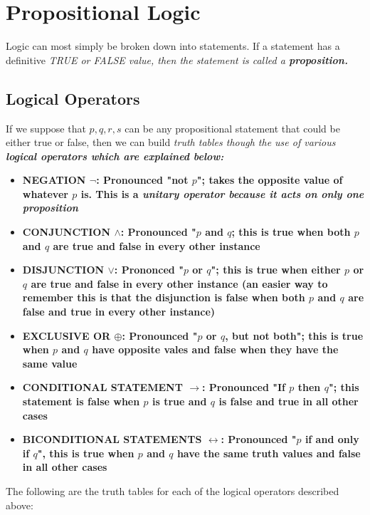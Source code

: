 \section{Propositional Logic}

Logic can most simply be broken down into statements. If a statement has a definitive \it{TRUE} or \it{FALSE} value, then the statement is called a \bf{proposition}. \\


\subsection{Logical Operators}

If we suppose that $p,q,r,s$ can be any propositional statement that could be either true or false, then we can build \it{truth tables} though the use of various \bf{logical operators} which are explained below:

\begin{itemize}
    \item \bf{NEGATION $\neg$:} Pronounced "not $p$"; takes the opposite value of whatever $p$ is. This is a \it{unitary operator} because it acts on only one proposition
    \item \bf{CONJUNCTION $\wedge$:} Pronounced "$p$ and $q$; this is true when both $p$ and $q$ are true and false in every other instance
    \item \bf{DISJUNCTION $\vee$:} Prononced "$p$ or $q$"; this is true when either $p$ or $q$ are true and false in every other instance (an easier way to remember this is that the disjunction is false when both $p$ and $q$ are false and true in every other instance)
    \item \bf{EXCLUSIVE OR $\oplus$:} Pronounced "$p$ or $q$, but not both"; this is true when $p$ and $q$ have opposite vales and false when they have the same value
    \item \bf{CONDITIONAL STATEMENT $\rightarrow$:} Pronounced "If $p$ then $q$"; this statement is false when $p$ is true and $q$ is false and true in all other cases 
    \item \bf{BICONDITIONAL STATEMENTS $\leftrightarrow$:} Pronounced "$p$ if and only if $q$", this is true when $p$ and $q$ have the same truth values and false in all other cases
\end{itemize}

The following are the truth tables for each of the logical operators described above:\\



